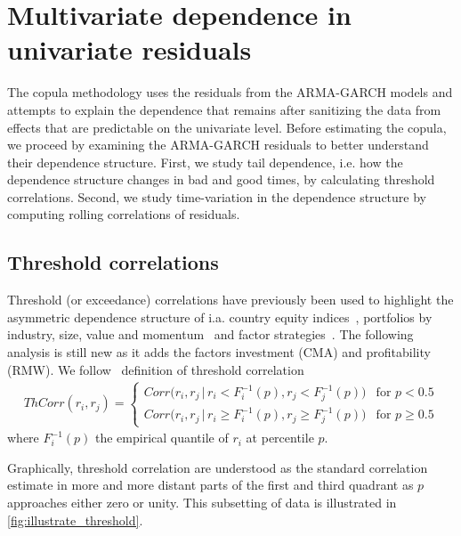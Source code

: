 \section{Multivariate dependence in univariate residuals} %
\label{sec:multivariate_dependence}

The copula methodology uses the residuals from the ARMA-GARCH models and attempts to explain the dependence that remains after sanitizing the data from effects that are predictable on the univariate level. Before estimating the copula, we proceed by examining the ARMA-GARCH residuals to better understand their dependence structure. First, we study tail dependence, i.e. how the dependence structure changes in bad and good times, by calculating threshold correlations. Second, we study time-variation in the dependence structure by computing rolling correlations of residuals.

\subsection{Threshold correlations}
\label{subsec:threshold_corr}
Threshold (or exceedance) correlations have previously been used to highlight the asymmetric dependence structure of i.a. country equity indices~\autocite{LonginSolnik2001}, portfolios by industry, size, value and momentum~\autocite{AngChen2002} and factor strategies~\autocite{ChristoffersenLanglois2013}. The following analysis is still new as it adds the factors investment (CMA) and profitability (RMW). We follow~\textcite{ChristoffersenLanglois2013} definition of threshold correlation
\begin{align}
    ThCorr(r_i, r_j) = 
    \begin{cases} 
        Corr\Big(r_i, r_j \,|\, r_i < F_i^{-1}(p), r_j < F_j^{-1}(p)\Big)  & \text{for } p < 0.5 \\
        Corr\Big(r_i, r_j \,|\, r_i \geq F_i^{-1}(p), r_j \geq F_j^{-1}(p)\Big)  & \text{for } p \geq 0.5
    \end{cases}
\end{align}
where $F_i^{-1}(p)$ the empirical quantile of $r_i$ at percentile $p$. 

Graphically, threshold correlation are understood as the standard correlation estimate in more and more distant parts of the first and third quadrant as $p$ approaches either zero or unity. This subsetting of data is illustrated in \autoref{fig:illustrate_threshold}. 

